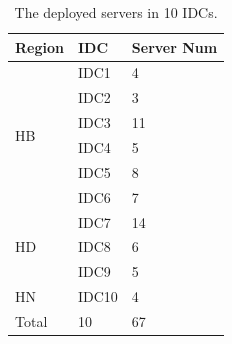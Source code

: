 \begin{table}[t]
\centering
\qquad
\begin{tabular}{|p{2cm}<{\centering}|p{2cm}<{\centering}|p{2cm}<{\centering}|}
\hline
 \rowcolor[gray]{0.9}
\textbf{Region} & \textbf{IDC} & \textbf{Server Num} \\
\hline \hline
\multirow{6}{*}{HB}
& IDC1 & 4\\
\cline{2-3}
& IDC2 & 3\\
\cline{2-3}
& IDC3 & 11\\
\cline{2-3}
& IDC4 & 5\\
\cline{2-3}
& IDC5 & 8\\
\cline{2-3}
& IDC6 & 7\\
\hline
\multirow{3}{*}{HD}
& IDC7 & 14 \\
\cline{2-3}
& IDC8 & 6 \\
\cline{2-3}
& IDC9 & 5 \\
\hline
HN & IDC10 & 4\\
\hline \hline
 \rowcolor[gray]{0.9}
Total & 10 & 67\\
\hline
\end{tabular}
\caption{The deployed servers in 10 IDCs.}
\label{10IDCs}
\end{table}



%
%
%
%
%

